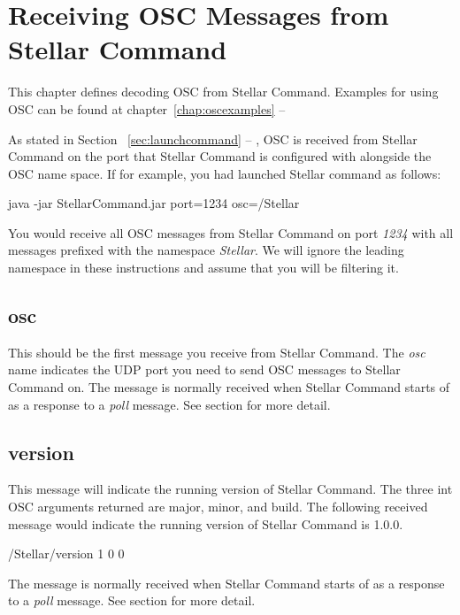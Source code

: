 \chapter{Receiving OSC Messages from Stellar Command}
This chapter defines decoding OSC from Stellar Command.  Examples for using OSC can be found at 
chapter~\ref{chap:oscexamples} --
\emph{}


As stated in Section ~\ref{sec:launchcommand} --
\emph{}, OSC is received from Stellar Command on the port that Stellar Command is configured with alongside the OSC name space. If for example, you had launched Stellar command as follows:
\begin{syntax}
	\medskip
	java -jar StellarCommand.jar port=1234 osc=/Stellar  \\
	\medskip
\end{syntax}

You would receive all OSC messages from Stellar Command on port \textit{1234} with all messages prefixed with the namespace \textit{Stellar}. We will ignore the leading namespace in these instructions and assume that you will be filtering it.

\section{osc}\label{sec:osc}
This should be the first message you receive from Stellar Command. The \textit{osc} name indicates the UDP port you need to send OSC messages to Stellar Command on. The message is normally received when Stellar Command starts of as a response to a \textit{poll} message. See section  for more detail.

\section{version}\label{sec:version}
This message will indicate the running version of Stellar Command. The three int OSC arguments returned are major, minor, and build. The following received message would indicate the running version of Stellar Command is 1.0.0.

\begin{syntax}
	\medskip
	/Stellar/version 1 0 0 \\
	\medskip
\end{syntax}

The message is normally received when Stellar Command starts of as a response to a \textit{poll} message. See section  for more detail.

